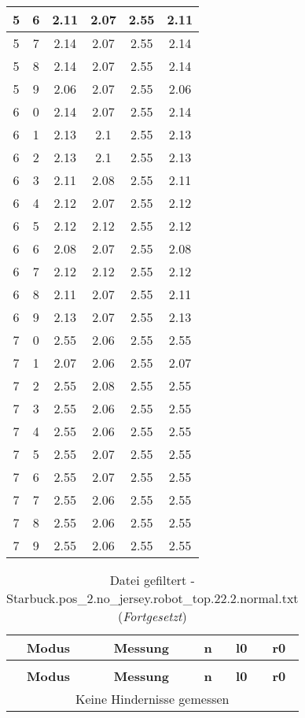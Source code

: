 \begin{longtable}{|c|c||c||c|c||c|}
	5 & 6 & 2.11 & 2.07 & 2.55 & 2.11 \\ \hline
	5 & 7 & 2.14 & 2.07 & 2.55 & 2.14 \\ \hline
	5 & 8 & 2.14 & 2.07 & 2.55 & 2.14 \\ \hline
	5 & 9 & 2.06 & 2.07 & 2.55 & 2.06 \\ \hline
	6 & 0 & 2.14 & 2.07 & 2.55 & 2.14 \\ \hline
	6 & 1 & 2.13 & 2.1 & 2.55 & 2.13 \\ \hline
	6 & 2 & 2.13 & 2.1 & 2.55 & 2.13 \\ \hline
	6 & 3 & 2.11 & 2.08 & 2.55 & 2.11 \\ \hline
	6 & 4 & 2.12 & 2.07 & 2.55 & 2.12 \\ \hline
	6 & 5 & 2.12 & 2.12 & 2.55 & 2.12 \\ \hline
	6 & 6 & 2.08 & 2.07 & 2.55 & 2.08 \\ \hline
	6 & 7 & 2.12 & 2.12 & 2.55 & 2.12 \\ \hline
	6 & 8 & 2.11 & 2.07 & 2.55 & 2.11 \\ \hline
	6 & 9 & 2.13 & 2.07 & 2.55 & 2.13 \\ \hline
	7 & 0 & 2.55 & 2.06 & 2.55 & 2.55 \\ \hline
	7 & 1 & 2.07 & 2.06 & 2.55 & 2.07 \\ \hline
	7 & 2 & 2.55 & 2.08 & 2.55 & 2.55 \\ \hline
	7 & 3 & 2.55 & 2.06 & 2.55 & 2.55 \\ \hline
	7 & 4 & 2.55 & 2.06 & 2.55 & 2.55 \\ \hline
	7 & 5 & 2.55 & 2.07 & 2.55 & 2.55 \\ \hline
	7 & 6 & 2.55 & 2.07 & 2.55 & 2.55 \\ \hline
	7 & 7 & 2.55 & 2.06 & 2.55 & 2.55 \\ \hline
	7 & 8 & 2.55 & 2.06 & 2.55 & 2.55 \\ \hline
	7 & 9 & 2.55 & 2.06 & 2.55 & 2.55 \\ \hline
\end{longtable}
\clearpage{}
\begin{longtable}{|c|c||c||c||c|}
	\caption{Datei gefiltert - Starbuck.pos\_2.no\_jersey.robot\_top.22.2.normal.txt} \label{tab:Starbuck.pos-2.no-jersey.robot-top.22.2.normal.txt} \\ \hline
	\textbf{Modus} & \textbf{Messung} & \textbf{n} & \textbf{l0} & \textbf{r0}\\ \hline
	\endfirsthead
	\caption[]{Datei gefiltert - Starbuck.pos\_2.no\_jersey.robot\_top.22.2.normal.txt (\emph{Fortgesetzt})} \\ \hline
	\textbf{Modus} & \textbf{Messung} & \textbf{n} & \textbf{l0} & \textbf{r0}\\ \hline
	\endhead
	\multicolumn{5}{|c|}{Keine Hindernisse gemessen} \\ \hline
\end{longtable}
